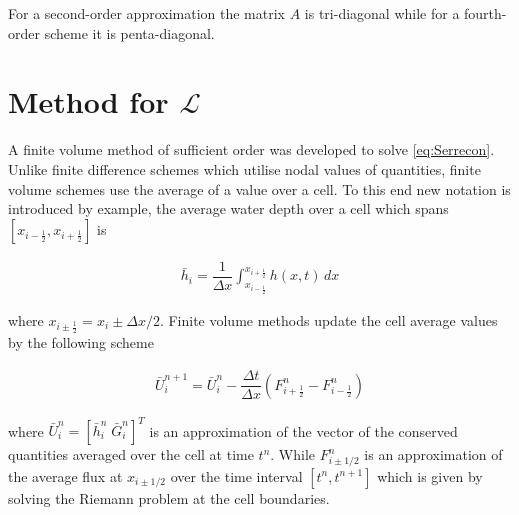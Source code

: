 \documentclass[SingleSpace,12pt]{Serre_ASCE}
\begin{document}
For a second-order approximation the matrix $A$ is tri-diagonal while for a fourth-order scheme it is penta-diagonal.
\section{Method for $\mathcal{L}$}
A finite volume method of sufficient order was developed to solve \eqref{eq:Serrecon}. Unlike finite difference schemes which utilise nodal values of quantities, finite volume schemes use the average of a value over a cell. To this end new notation is introduced by example, the average water depth over a cell which spans $\left[x_{i - \frac{1}{2}} , x_{i + \frac{1}{2}}\right]$ is 
\begin{linenomath*}
\begin{gather*}
\bar{h}_i = \dfrac{1}{\Delta x} \int_{x_{i-\frac{1}{2}}}^{x_{i+\frac{1}{2}}} h(x,t) \, dx 
\end{gather*}
\end{linenomath*}
where $x_{i \pm \frac{1}{2}} = x_i \pm \Delta x/2$. Finite volume methods update the cell average values by the following scheme
\begin{linenomath*}
\begin{gather}\label{eq:FVMupdate}
\bar{U}^{n+1}_i = \bar{U}^{n}_i - \dfrac{\Delta t}{\Delta x} \left(F^n_{i+ \frac{1}{2}} - F^n_{i - \frac{1}{2}} \right)
\end{gather}
\end{linenomath*}
where $\bar{U}^{n}_i = \left[ \bar{h}^{n}_i \; \bar{G}^{n}_i \right] ^T$ is an approximation of the vector of the conserved quantities averaged over the cell at time $t^n$. While $F^n_{i\pm 1/2}$ is an approximation of the average flux at $x_{i \pm 1/2 }$ over the time interval $[t^n, t^{n+1}]$ which is given by solving the Riemann problem at the cell boundaries.
\end{document}

